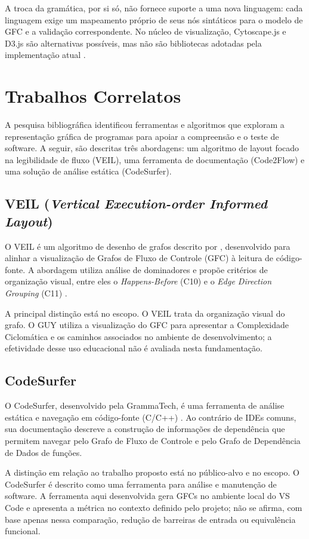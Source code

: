 A troca da gramática, por si só, não fornece suporte a uma nova linguagem: cada linguagem exige um mapeamento próprio de seus nós sintáticos para o modelo de GFC e a validação correspondente. No núcleo de visualização, Cytoscape.js e D3.js são alternativas possíveis, mas não são bibliotecas adotadas pela implementação atual \cite{CytoscapeWeb,D3Web}.


\section{Trabalhos Correlatos}

A pesquisa bibliográfica identificou ferramentas e algoritmos que exploram a representação gráfica de programas para apoiar a compreensão e o teste de software. A seguir, são descritas três abordagens: um algoritmo de layout focado na legibilidade de fluxo (VEIL), uma ferramenta de documentação (Code2Flow) e uma solução de análise estática (CodeSurfer).

\subsection{VEIL (\textit{Vertical Execution-order Informed Layout})}
O VEIL é um algoritmo de desenho de grafos descrito por \cite{veil}, desenvolvido para alinhar a visualização de Grafos de Fluxo de Controle (GFC) à leitura de código-fonte. A abordagem utiliza análise de dominadores e propõe critérios de organização visual, entre eles o \textit{Happens-Before} (C10) e o \textit{Edge Direction Grouping} (C11) \cite{veil}.

A principal distinção está no escopo. O VEIL trata da organização visual do grafo. O GUY utiliza a visualização do GFC para apresentar a Complexidade Ciclomática e os caminhos associados no ambiente de desenvolvimento; a efetividade desse uso educacional não é avaliada nesta fundamentação.

\subsection{CodeSurfer}
O CodeSurfer, desenvolvido pela GrammaTech, é uma ferramenta de análise estática e navegação em código-fonte (C/C++) \cite{codesurfer}. Ao contrário de IDEs comuns, sua documentação descreve a construção de informações de dependência que permitem navegar pelo Grafo de Fluxo de Controle e pelo Grafo de Dependência de Dados de funções.

A distinção em relação ao trabalho proposto está no público-alvo e no escopo. O CodeSurfer é descrito como uma ferramenta para análise e manutenção de software. A ferramenta aqui desenvolvida gera GFCs no ambiente local do VS Code e apresenta a métrica no contexto definido pelo projeto; não se afirma, com base apenas nessa comparação, redução de barreiras de entrada ou equivalência funcional.

